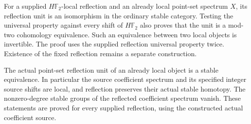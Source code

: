 \begin{proposition}
  \label{prop:local-spectrum-reflection-unit}
  \leanok
  For a supplied $H\mathbb F_2$-local reflection and an already local
  point-set spectrum $X$, its reflection unit is an isomorphism in the
  ordinary stable category.
  Testing the universal property against every shift of $H\mathbb F_2$
  also proves that the unit is a mod-two cohomology equivalence.
  Such an equivalence between two local objects is invertible.
  The proof uses the supplied reflection universal property twice.
  Existence of the fixed reflection remains a separate construction.
\end{proposition}

\begin{proposition}
  \label{prop:source-reflection-homotopy}
  \leanok
  The actual point-set reflection unit of an already local object
  is a stable equivalence. In particular the source coefficient spectrum
  and its specified integer source shifts are local, and reflection
  preserves their actual stable homotopy. The nonzero-degree stable
  groups of the reflected coefficient spectrum vanish.
  These statements are proved for every supplied reflection, using the
  constructed actual coefficient source.
\end{proposition}

